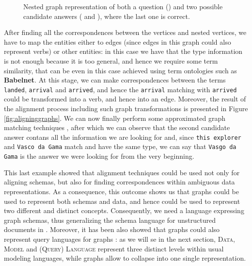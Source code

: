 \begin{example}
\begin{figure}[!p]
	\caption{Nested graph representation of both a question () and two possible candidate answers ( and ), where the last one is correct.}
\end{figure}
	After finding all the correspondences between the vertices and nested vertices, we have to map the  entities either to edges (since edges in this graph could also represent verbs) or other entities: in this case we have that the type information is not enough because it is too general, and hence we require some term similarity, that can be even in this case achieved using term ontologies such as \textbf{Babelnet}. At this stage, we can make correspondences between the terms \texttt{landed}, \texttt{arrival} and \texttt{arrived}, and hence the \texttt{arrival} matching with \texttt{arrived} could be transformed into a verb, and hence into an edge. 
	Moreover, the result of the alignment process including such graph transformations is presented in Figure \ref{fig:aligninggraphs}. We can now finally perform some approximated graph matching techniques \cite{VirgilioMT15,Aligon201520}, after which we can observe that the second candidate answer contans all the information we are looking for and, since \texttt{this explorer} and \texttt{Vasco da Gama} match and have the same type, we can say that \texttt{Vasgo da Gama} is the answer we were looking for from the very beginning.
\end{example}

This last example showed that alignment techniques could  be used not only for aligning schemas, but also for finding correspondences within ambiguous data representations. As a consequence, this outcome shows us that graphs could be used to represent both schemas and data, and hence could be used to represent two different and distinct concepts. Consequently, we need a language expressing graph schemas, thus generalizing the schema language for unstructured documents in \cite{BaaziziLCGS17}. Moreover, it has been also showed that graphs could also represent query languages for graphs \cite{consens1990a,GraphLogAggr,n3,Goertzel2014}: as we will se in the next section, \textsc{Data}, \textsc{Model} and \textsc{(Query) Language} represent three distinct levels within usual modeling languages, while graphs allow to collapse into one single representation.

